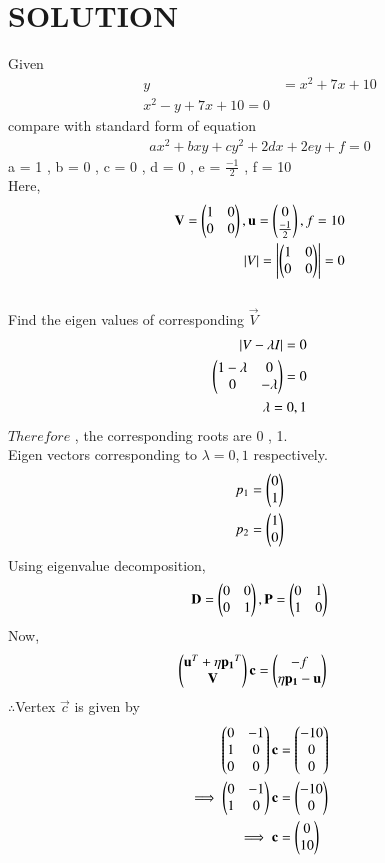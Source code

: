 \documentclass[journal,12pt,twocolumn]{IEEEtran}
\begin{document}
\section{SOLUTION}  
Given
\begin{align}
y& = x^2+7x+10
\\
x^2-y+7x+10 = 0
\end{align}
compare with standard form of equation
\begin{align}
a{x}^2+b{x}{y}+c{y}^2+2d{x}+2e{y}+f = 0
\end{align}
a = 1 , b = 0 , c = 0 , d = 0 , e = $\frac{-1}{2}$ , f = 10
\\
Here,
\begin{align}
\mathbf{V} = \begin{pmatrix}1 & 0 \\ 0 & 0\end{pmatrix},\mathbf{u}=\begin{pmatrix}0 \\ \frac{-1}{2}\end{pmatrix},f = 10
\\
\left\vert V\right\vert = \left\vert\begin{pmatrix}1 & 0 \\ 0 & 0\end{pmatrix}\right\vert = 0
\end{align}
\\
Find the eigen values of corresponding $\vec{V}$
\begin{align}
\left\vert V-\lambda{I}\right\vert = 0
\\
\begin{pmatrix}1-\lambda & 0 \\ 0 & -\lambda\end{pmatrix} = 0
\\
\lambda = 0 , 1
\end{align}
$Therefore$ , the corresponding roots are 0 , 1.
\\
Eigen vectors corresponding to $\lambda = 0 , 1$ respectively.
\begin{align}
p_1 = \begin{pmatrix}0 \\ 1\end{pmatrix}
\\
p_2 = \begin{pmatrix}1 \\ 0\end{pmatrix}
\end{align}
Using eigenvalue decomposition,
\begin{align}
\mathbf{D} = \begin{pmatrix}0 & 0\\0 & 1\end{pmatrix} ,\mathbf{P}=\begin{pmatrix}0 & 1\\1 & 0\end{pmatrix}
\end{align}
Now,
\begin{align}
\begin{pmatrix}\mathbf{u}^T + \eta\mathbf{p_1}^T \\ \mathbf{V}\end{pmatrix}\mathbf{c} &= \begin{pmatrix}-f \\ \eta\mathbf{p_1}-\mathbf{u}\end{pmatrix} 
\end{align}
$\therefore$Vertex $\vec{c}$ is given by
\begin{align}
\begin{pmatrix}0 & -1 \\ 1 & 0 \\ 0 & 0\end{pmatrix}\mathbf{c} &= \begin{pmatrix}-10 \\ 0 \\ 0\end{pmatrix} \\
\implies  \begin{pmatrix}0 & -1 \\ 1 & 0\end{pmatrix}\mathbf{c} &= \begin{pmatrix}-10 \\ 0\end{pmatrix}
\\
\implies \mathbf{c} &= \begin{pmatrix}0\\10\end{pmatrix}
\end{align}
\end{document}
